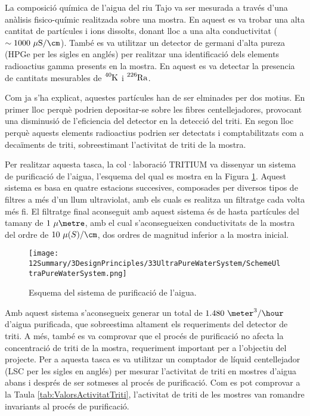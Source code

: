 La composició química de l'aigua del riu Tajo va ser mesurada a través d'una anàlisis fisico-químic realitzada sobre una mostra. En aquest es va trobar una alta cantitat de partícules i ions dissolts, donant lloc a una alta conductivitat ($\sim 1000~\mu\text{S}/\cm$). També es va utilitzar un detector de germani d'alta pureza (HPGe per les sigles en anglés) per realitzar una identificació dels elements radioactius gamma presents en la mostra. En aquest es va detectar la presencia de cantitats mesurables de $\ce{^{40}K}$ i $\ce{^{226}Ra}$.

Com ja s'ha explicat, aquestes partícules han de ser elminades per dos motius. En primer lloc perquè podrien depositar-se sobre les fibres centellejadores, provocant una disminusió de l'eficiencia del detector en la detecció del triti. En segon lloc perquè aquests elements radioactius podrien ser detectats i comptabilitzats com a decaïments de triti, sobreestimant l'activitat de triti de la mostra.

Per realitzar aquesta tasca, la col·laboració TRITIUM va dissenyar un sistema de purificació de l'aigua, l'esquema del qual es mostra en la Figura \ref{fig:EsquemaSistemaAiguaUltrapura}. Aquest sistema es basa en quatre estacions succesives, composades per diversos tipos de filtres a més d'un llum ultraviolat, amb els cuals es realitza un filtratge cada volta més fi. El filtratge final aconseguit amb aquest sistema és de hasta partícules del tamany de $1~\mu\metre$, amb el cual s'aconsegueixen conductivitats de la mostra del ordre de $10~\mu\text(S)/\cm$, dos ordres de magnitud inferior a la mostra inicial.

\begin{figure}[htbp]
\centering
\texttt{[image: 12Summary/3DesignPrinciples/33UltraPureWaterSystem/SchemeUltraPureWaterSystem.png]}
\caption{Esquema del sistema de purificació de l'aigua.\label{fig:EsquemaSistemaAiguaUltrapura}}
\end{figure}

Amb aquest sistema s'aconsegueix generar un total de $1.480~\meter^3/\hour$ d'aigua purificada, que sobreestima altament els requeriments del detector de triti. A més, també es va comprovar que el procés de purificació no afecta la concentració de triti de la mostra, requeriment important per a l'objectiu del projecte. Per a aquesta tasca es va utilitzar un comptador de líquid centellejador (LSC per les sigles en anglés) per mesurar l'activitat de triti en mostres d'aigua abans i després de ser sotmeses al procés de purificació. Com es pot comprovar a la Taula \ref{tab:ValorsActivitatTriti}, l'activitat de triti de les mostres van romandre invariants al procés de purificació.


